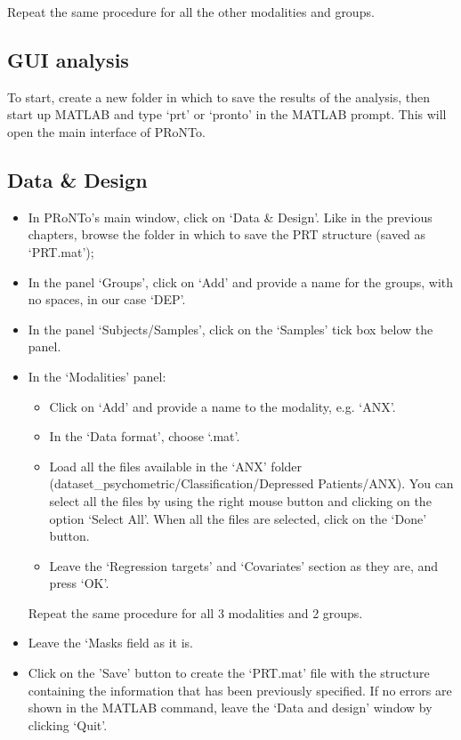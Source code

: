 Repeat the same procedure for all the other modalities and groups.

\subsection{GUI analysis}

To start, create a new folder in which to save the results of the analysis, then start up MATLAB and type `prt' or `pronto' in the MATLAB prompt. This will open the main interface of PRoNTo.


\subsection{Data \& Design}

\begin{itemize}
	
	\item In PRoNTo's main window, click on `Data \& Design'. Like in the previous chapters, browse the folder in which to save the PRT structure (saved as `PRT.mat');
	
	\item In the panel `Groups', click on `Add' and provide a name for the groups, with no spaces, in our case `DEP'.
	
	\item In the panel `Subjects/Samples', click on the `Samples' tick box below the panel.
	
	\item In the `Modalities' panel:
	
	\begin{itemize}
	\item Click on `Add' and provide a name to the modality, e.g. `ANX'. \item In the `Data format', choose `.mat'.
	\item Load all the files available in the `ANX' folder (dataset\_psychometric/Classification/Depressed Patients/ANX). You can select all the files by using the right mouse button and clicking on the option `Select All'. When all the files are selected, click on the `Done' button.
	
	\item Leave the `Regression targets' and `Covariates' section as they are, and press `OK'.
	\end{itemize}
	
	Repeat the same procedure for all 3 modalities and 2 groups.
	
	\item Leave the `Masks field as it is.

	\item Click on the 'Save' button to create the `PRT.mat' file with the structure containing the information that has been previously specified. If no errors are shown in the MATLAB command, leave the `Data and design' window by clicking `Quit'.
	
\end{itemize}

